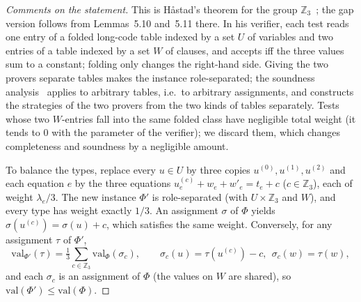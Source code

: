 \documentclass[11pt,letterpaper]{article}
\theoremstyle{remark}
\newcommand{\Z}{\mathbb{Z}}
\newcommand{\val}{\mathrm{val}}
\begin{document}
\begin{proof}[Comments on the statement]
This is H\aa stad's theorem for the group $\Z_3$~\cite[Thm.~5.9]{Hastad01}; the gap version follows from
Lemmas~5.10 and~5.11 there. In his verifier, each test reads one entry of a folded long-code table indexed
by a set $U$ of variables and two entries of a table indexed by a set $W$ of clauses, and accepts iff the
three values sum to a constant; folding only changes the right-hand side. Giving the two provers separate
tables makes the instance role-separated; the soundness analysis~\cite[Lemma~5.11]{Hastad01} applies to
arbitrary tables, i.e.\ to arbitrary assignments, and constructs the strategies of the two provers from
the two kinds of tables separately. Tests whose two $W$-entries fall into the same folded class have
negligible total weight (it tends to $0$ with the parameter of the verifier); we discard them, which
changes completeness and soundness by a negligible amount.

To balance the types, replace every $u\in U$ by three copies $u^{(0)},u^{(1)},u^{(2)}$ and each equation $e$
by the three equations $u_e^{(c)}+w_e+w'_e = t_e+c$ ($c\in\Z_3$), each of weight $\lambda_e/3$. The new
instance $\Phi'$ is role-separated (with $U\times\Z_3$ and $W$), and every type has weight exactly $1/3$. An
assignment $\sigma$ of $\Phi$ yields $\sigma(u^{(c)})=\sigma(u)+c$, which satisfies the same weight.
Conversely, for any assignment $\tau$ of $\Phi'$,
\[
\val_{\Phi'}(\tau)=\tfrac13\textstyle\sum_{c\in\Z_3}\val_\Phi(\sigma_c),\qquad
\sigma_c(u)=\tau(u^{(c)})-c,\ \ \sigma_c(w)=\tau(w),
\]
and each $\sigma_c$ is an assignment of $\Phi$ (the values on $W$ are shared), so $\val(\Phi')\le\val(\Phi)$.
\end{proof}
\end{document}
